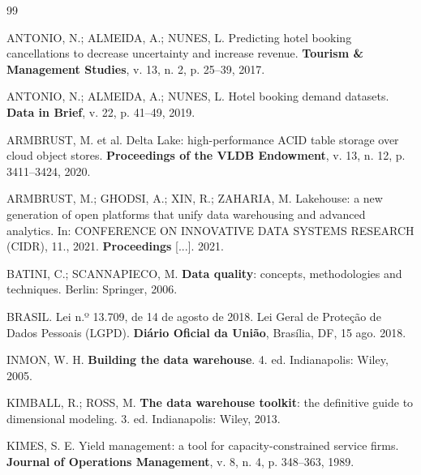 \documentclass[11pt,a4paper]{article}
\begin{document}
\footnotesize
\renewcommand{\bibsection}{\section*{Referências}}
\setlength{\bibsep}{2pt}
\begin{thebibliography}{99}

ANTONIO, N.; ALMEIDA, A.; NUNES, L. Predicting hotel booking cancellations to decrease uncertainty and increase revenue. \textbf{Tourism \& Management Studies}, v. 13, n. 2, p. 25--39, 2017.

ANTONIO, N.; ALMEIDA, A.; NUNES, L. Hotel booking demand datasets. \textbf{Data in Brief}, v. 22, p. 41--49, 2019.

ARMBRUST, M. et al. Delta Lake: high-performance ACID table storage over cloud object stores. \textbf{Proceedings of the VLDB Endowment}, v. 13, n. 12, p. 3411--3424, 2020.

ARMBRUST, M.; GHODSI, A.; XIN, R.; ZAHARIA, M. Lakehouse: a new generation of open platforms that unify data warehousing and advanced analytics. In: CONFERENCE ON INNOVATIVE DATA SYSTEMS RESEARCH (CIDR), 11., 2021. \textbf{Proceedings} [...]. 2021.

BATINI, C.; SCANNAPIECO, M. \textbf{Data quality}: concepts, methodologies and techniques. Berlin: Springer, 2006.

BRASIL. Lei n.º 13.709, de 14 de agosto de 2018. Lei Geral de Proteção de Dados Pessoais (LGPD). \textbf{Diário Oficial da União}, Brasília, DF, 15 ago. 2018.

INMON, W. H. \textbf{Building the data warehouse}. 4. ed. Indianapolis: Wiley, 2005.

KIMBALL, R.; ROSS, M. \textbf{The data warehouse toolkit}: the definitive guide to dimensional modeling. 3. ed. Indianapolis: Wiley, 2013.

KIMES, S. E. Yield management: a tool for capacity-constrained service firms. \textbf{Journal of Operations Management}, v. 8, n. 4, p. 348--363, 1989.


\end{thebibliography}
\end{document}
